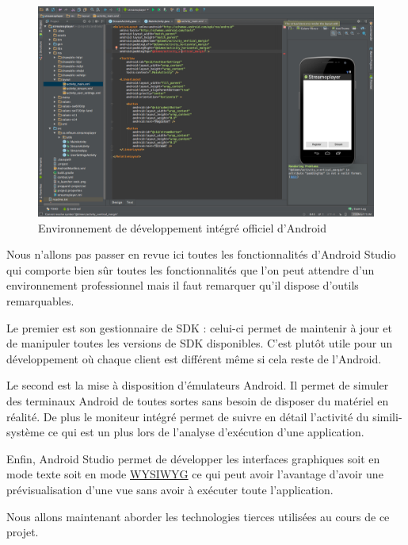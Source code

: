 \begin{figure}[H]
    \centering
    \includegraphics[width=\textwidth]{./img/android-studio.png}
    \caption{Environnement de développement intégré officiel d’Android}
    \label{androidstudio}
\end{figure}

Nous n’allons pas passer en revue ici toutes les fonctionnalités d’Android Studio qui comporte bien sûr toutes les fonctionnalités que l’on peut attendre d’un environnement professionnel mais il faut remarquer qu’il dispose d’outils remarquables.

Le premier est son gestionnaire de SDK : celui-ci permet de maintenir à jour et de manipuler toutes les versions de SDK disponibles. C’est plutôt utile pour un développement où chaque client est différent même si cela reste de l’Android.

Le second est la mise à disposition d’émulateurs Android. Il permet de simuler des terminaux Android de toutes sortes sans besoin de disposer du matériel en réalité. De plus le moniteur intégré permet de suivre en détail l’activité du simili-système ce qui est un plus lors de l’analyse d’exécution d’une application.

Enfin, Android Studio permet de développer les interfaces graphiques soit en mode texte soit en mode \underline{WYSIWYG} ce qui peut avoir l’avantage d’avoir une prévisualisation d’une vue sans avoir à exécuter toute l’application.

Nous allons maintenant aborder les technologies tierces utilisées au cours de ce projet.